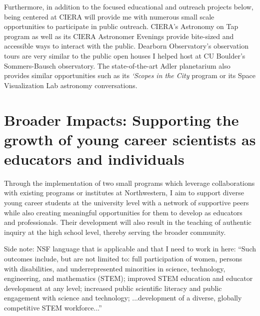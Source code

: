 \documentclass[aasms,12pt]{article}
\begin{document}
Furthermore, in addition to the focused educational and outreach projects below, being centered at CIERA will provide me with numerous small scale opportunities to participate in public outreach.
CIERA's Astronomy on Tap program as well as its CIERA Astronomer Evenings provide bite-sized and accessible ways to interact with the public.
Dearborn Observatory's observation tours are very similar to the public open houses I helped host at CU Boulder's Sommers-Bausch observatory.
The state-of-the-art Adler planetarium also provides similar opportunities such as its \emph{`Scopes in the City} program or its Space Visualization Lab astronomy conversations.


\section{Broader Impacts: Supporting the growth of young career scientists as educators and individuals}
\label{sct:outreach}
Through the implementation of two small programs which leverage collaborations with existing programs or institutes at Northwestern, I aim to support diverse young career students at the university level with a network of supportive peers while also creating meaningful opportunities for them to develop as educators and professionals.
Their development will also result in the teaching of authentic inquiry at the high school level, thereby serving the broader community.

Side note: NSF language that is applicable and that I need to work in here: ``Such outcomes include, but are not limited to: full participation of women, persons with disabilities, and underrepresented minorities in science, technology, engineering, and mathematics (STEM); improved STEM education and educator development at any level; increased public scientific literacy and public engagement with science and technology; ...development of a diverse, globally competitive STEM workforce...''
\end{document}
